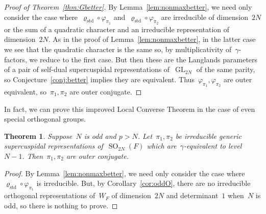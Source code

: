 \documentclass[12pt]{amsart}
\newcommand{\GL}{\operatorname{GL}}
\newcommand{\SO}{\operatorname{SO}}
\def\rhostd{\varrho_{\mathrm{std}}} %
\newtheorem{thm}{Theorem}[section]
\newtheorem{thm}[equation]{Theorem}
\begin{document}
\begin{proof}[Proof of Theorem~\ref{thm:Gbetter}]
By Lemma~\ref{lem:nonmaxbetter}, we need only consider the case where~$\rhostd\circ\varphi_{\pi_1}$ and~$\rhostd\circ\varphi_{\pi_2}$ are irreducible of dimension~$2N$ or the sum of a quadratic character and an irreducible representation of dimension~$2N$. As in the proof of Lemma~\ref{lem:nonmaxbetter}, in the latter case we see that the quadratic character is the same so, by multiplicativity of~$\gamma$-factors, we reduce to the first case. But then these are the Langlands parameters of a pair of self-dual supercuspidal representations of~$\GL_{2N}$ of the same parity, so Conjecture~\ref{conj:better} implies they are equivalent. Thus~$\varphi_{\pi_1},\varphi_{\pi_2}$ are outer equivalent, so~$\pi_1,\pi_2$ are outer conjugate.
\end{proof}

In fact, we can prove this improved Local Converse Theorem in the case of even special orthogonal groups.

\begin{thm}\label{thm:SObetter}
Suppose~$N$ is odd and $p>N$. Let~$\pi_1,\pi_2$ be irreducible generic supercuspidal representations of~$\SO_{2N}(F)$ which are~$\gamma$-equivalent to level~$N-1$. Then~$\pi_1, \pi_2$ are outer conjugate.  
\end{thm}

\begin{proof}
By Lemma~\ref{lem:nonmaxbetter}, we need only consider the case where~$\rhostd\circ\varphi_{\pi_1}$ is irreducible. But, by Corollary~\ref{cor:oddO}, there are no irreducible orthogonal representations of~$W_F$ of dimension~$2N$ and determinant~$1$ when~$N$ is odd, so there is nothing to prove.
\end{proof}


\end{document}
